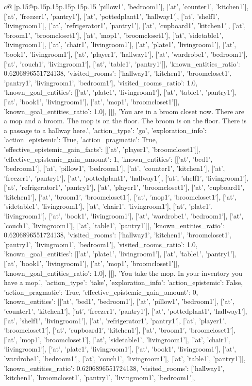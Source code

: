 \documentclass{article}
\begin{document}
{\begin{supertabular}{c@{$\;$}|p{.15\linewidth}@{}p{.15\linewidth}p{.15\linewidth}p{.15\linewidth}p{.15\linewidth}p{.15\linewidth}}
{{{'pillow1', 'bedroom1'], ['at', 'counter1', 'kitchen1'], ['at', 'freezer1', 'pantry1'], ['at', 'pottedplant1', 'hallway1'], ['at', 'shelf1', 'livingroom1'], ['at', 'refrigerator1', 'pantry1'], ['at', 'cupboard1', 'kitchen1'], ['at', 'broom1', 'broomcloset1'], ['at', 'mop1', 'broomcloset1'], ['at', 'sidetable1', 'livingroom1'], ['at', 'chair1', 'livingroom1'], ['at', 'plate1', 'livingroom1'], ['at', 'book1', 'livingroom1'], ['at', 'player1', 'hallway1'], ['at', 'wardrobe1', 'bedroom1'], ['at', 'couch1', 'livingroom1'], ['at', 'table1', 'pantry1']], 'known_entities_ratio': 0.6206896551724138, 'visited_rooms': ['hallway1', 'kitchen1', 'broomcloset1', 'pantry1', 'livingroom1', 'bedroom1'], 'visited_rooms_ratio': 1.0, 'known_goal_entities': [['at', 'plate1', 'livingroom1'], ['at', 'table1', 'pantry1'], ['at', 'book1', 'livingroom1'], ['at', 'mop1', 'broomcloset1']], 'known_goal_entities_ratio': 1.0}}], [[], 'You are in a broom closet now. There are a mop and a broom. The mop is on the floor. The broom is on the floor. There is a passage to a hallway here.', {'action_type': 'go', 'exploration_info': {'action_epistemic': True, 'action_pragmatic': True, 'effective_epistemic_gain_facts': [['at', 'player1', 'broomcloset1']], 'effective_epistemic_gain_amount': 1, 'known_entities': [['at', 'bed1', 'bedroom1'], ['at', 'pillow1', 'bedroom1'], ['at', 'counter1', 'kitchen1'], ['at', 'freezer1', 'pantry1'], ['at', 'pottedplant1', 'hallway1'], ['at', 'shelf1', 'livingroom1'], ['at', 'refrigerator1', 'pantry1'], ['at', 'player1', 'broomcloset1'], ['at', 'cupboard1', 'kitchen1'], ['at', 'broom1', 'broomcloset1'], ['at', 'mop1', 'broomcloset1'], ['at', 'sidetable1', 'livingroom1'], ['at', 'chair1', 'livingroom1'], ['at', 'plate1', 'livingroom1'], ['at', 'book1', 'livingroom1'], ['at', 'wardrobe1', 'bedroom1'], ['at', 'couch1', 'livingroom1'], ['at', 'table1', 'pantry1']], 'known_entities_ratio': 0.6206896551724138, 'visited_rooms': ['hallway1', 'kitchen1', 'broomcloset1', 'pantry1', 'livingroom1', 'bedroom1'], 'visited_rooms_ratio': 1.0, 'known_goal_entities': [['at', 'plate1', 'livingroom1'], ['at', 'table1', 'pantry1'], ['at', 'book1', 'livingroom1'], ['at', 'mop1', 'broomcloset1']], 'known_goal_entities_ratio': 1.0}}], [[], 'You take the mop. In your inventory you have a mop.', {'action_type': 'take', 'exploration_info': {'action_epistemic': False, 'action_pragmatic': True, 'effective_epistemic_gain_amount': 0, 'known_entities': [['at', 'bed1', 'bedroom1'], ['at', 'pillow1', 'bedroom1'], ['at', 'counter1', 'kitchen1'], ['at', 'freezer1', 'pantry1'], ['at', 'pottedplant1', 'hallway1'], ['at', 'shelf1', 'livingroom1'], ['at', 'refrigerator1', 'pantry1'], ['at', 'player1', 'broomcloset1'], ['at', 'cupboard1', 'kitchen1'], ['at', 'broom1', 'broomcloset1'], ['at', 'mop1', 'broomcloset1'], ['at', 'sidetable1', 'livingroom1'], ['at', 'chair1', 'livingroom1'], ['at', 'plate1', 'livingroom1'], ['at', 'book1', 'livingroom1'], ['at', 'wardrobe1', 'bedroom1'], ['at', 'couch1', 'livingroom1'], ['at', 'table1', 'pantry1']], 'known_entities_ratio': 0.6206896551724138, 'visited_rooms': ['hallway1', 'kitchen1', 'broomcloset1', 'pantry1', 'livingroom1', 'bedroom1'], }}}
\end{supertabular}}
\end{document}
